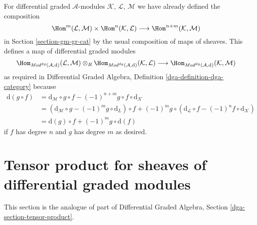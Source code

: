 \medskip\noindent
For differential graded $\mathcal{A}$-modules
$\mathcal{K}$, $\mathcal{L}$, $\mathcal{M}$
we have already defined the composition
$$
\Hom^m(\mathcal{L}, \mathcal{M}) \times
\Hom^n(\mathcal{K}, \mathcal{L}) \longrightarrow
\Hom^{n + m}(\mathcal{K}, \mathcal{M})
$$
in Section \ref{section-gm-gr-cat} by the usual composition
of maps of sheaves. This defines a map of differential graded modules
$$
\Hom_{\textit{Mod}^{dg}(\mathcal{A}, \text{d})}(\mathcal{L}, \mathcal{M})
\otimes_R
\Hom_{\textit{Mod}^{dg}(\mathcal{A}, \text{d})}(\mathcal{K}, \mathcal{L})
\longrightarrow
\Hom_{\textit{Mod}^{dg}(\mathcal{A}, \text{d})}(\mathcal{K}, \mathcal{M})
$$
as required in
Differential Graded Algebra, Definition \ref{dga-definition-dga-category}
because
\begin{align*}
\text{d}(g \circ f) & =
\text{d}_\mathcal{M} \circ g \circ f
- (-1)^{n + m} g \circ f \circ \text{d}_\mathcal{K} \\
& =
\left(\text{d}_\mathcal{M} \circ g - (-1)^m g \circ \text{d}_L\right) \circ f
+ (-1)^m g \circ \left(\text{d}_\mathcal{L} \circ f
- (-1)^n f \circ \text{d}_\mathcal{K}\right) \\
& =
\text{d}(g) \circ f + (-1)^m g \circ \text{d}(f)
\end{align*}
if $f$ has degree $n$ and $g$ has degree $m$ as desired.






\section{Tensor product for sheaves of differential graded modules}
\label{section-tensor-product-dg}

\noindent
This section is the analogue of part of
Differential Graded Algebra, Section \ref{dga-section-tensor-product}.


